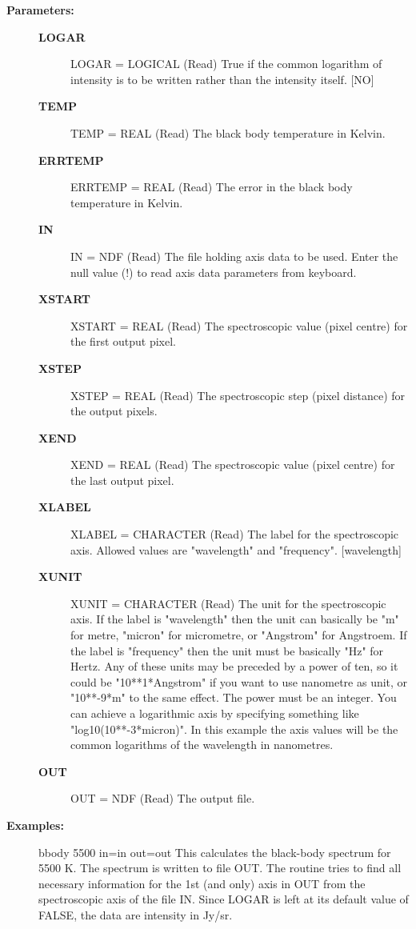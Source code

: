\begin{description}
\item [\textbf{Parameters:}]
\begin{description}
\item [\textbf{LOGAR}]
LOGAR = LOGICAL (Read)
   True if the common logarithm of intensity is to be written
   rather than the intensity itself. [NO]
\item [\textbf{TEMP}]
TEMP = REAL (Read)
   The black body temperature in Kelvin.
\item [\textbf{ERRTEMP}]
ERRTEMP = REAL (Read)
   The error in the black body temperature in Kelvin.
\item [\textbf{IN}]
IN = NDF (Read)
   The file holding axis data to be used. Enter the null value (!)
   to read axis data parameters from keyboard.
\item [\textbf{XSTART}]
XSTART = REAL (Read)
   The spectroscopic value (pixel centre) for the first output
   pixel.
\item [\textbf{XSTEP}]
XSTEP = REAL (Read)
   The spectroscopic step (pixel distance) for the output pixels.
\item [\textbf{XEND}]
XEND = REAL (Read)
   The spectroscopic value (pixel centre) for the last output
   pixel.
\item [\textbf{XLABEL}]
XLABEL = CHARACTER (Read)
   The label for the spectroscopic axis. Allowed values are
   "wavelength" and "frequency". [wavelength]
\item [\textbf{XUNIT}]
XUNIT = CHARACTER (Read)
   The unit for the spectroscopic axis.
   If the label is "wavelength" then the unit can basically be "m"
   for metre, "micron" for micrometre, or "Angstrom" for
   Angstroem. If the label is "frequency" then the unit must be
   basically "Hz" for Hertz.
   Any of these units may be preceded by a power of ten, so it
   could be "10**1*Angstrom" if you want to use nanometre as unit,
   or "10**-9*m" to the same effect. The power must be an
   integer.
   You can achieve a logarithmic axis by specifying something like
   "log10(10**-3*micron)". In this example the axis values will be
   the common logarithms of the wavelength in nanometres.
\item [\textbf{OUT}]
OUT = NDF (Read)
   The output file.
\end{description}

\item [\textbf{Examples:}]
\begin{terminalv}
bbody 5500 in=in out=out
   This calculates the black-body spectrum for 5500 K. The
   spectrum is written to file OUT. The routine tries to find all
   necessary information for the 1st (and only) axis in OUT from
   the spectroscopic axis of the file IN. Since LOGAR is left at
   its default value of FALSE, the data are intensity in Jy/sr.


\end{terminalv}
\end{description}
